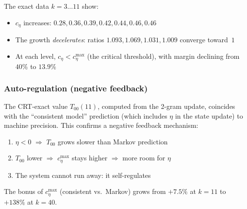 \documentclass[12pt,a4paper]{article}
\begin{document}
The exact data $k = 3\ldots 11$ show:
\begin{itemize}[nosep]
\item $c_\eta$ increases: $0.28, 0.36, 0.39, 0.42, 0.44, 0.46, 0.46$
\item The growth \emph{decelerates}: ratios
  $1.093, 1.069, 1.031, 1.009$ converge toward~$1$
\item At each level, $c_\eta < c_\eta^{\max}$ (the critical threshold),
  with margin declining from $40\%$ to $13.9\%$
\end{itemize}

\subsubsection{Auto-regulation (negative feedback)}
\label{sec:ch7b_auto}

The CRT-exact value $T_{00}(11)$, computed from the 2-gram update,
coincides with the ``consistent model'' prediction (which includes
$\eta$ in the state update) to machine precision. This confirms a
negative feedback mechanism:

\begin{enumerate}[nosep]
\item $\eta < 0$ $\Rightarrow$ $T_{00}$ grows slower than Markov prediction
\item $T_{00}$ lower $\Rightarrow$ $c_\eta^{\max}$ stays higher $\Rightarrow$ more room for $\eta$
\item The system cannot run away: it self-regulates
\end{enumerate}

The bonus of $c_\eta^{\max}$ (consistent vs.\ Markov) grows from
$+7.5\%$ at $k = 11$ to $+138\%$ at $k = 40$.
\end{document}
